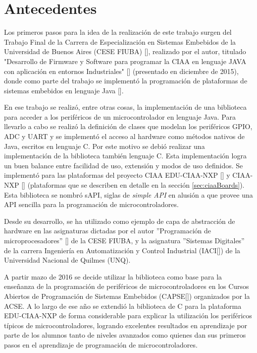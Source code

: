 \section{Antecedentes}
\label{sec:antecedentes}

Los primeros pasos para la idea de la realización de este trabajo surgen del Trabajo Final de la Carrera de Especialización en Sistemas Embebidos de la Universidad de Buenos Aires (CESE FIUBA) [], realizado por el autor, titulado "Desarrollo de Firmware y Software para programar la CIAA en lenguaje JAVA con aplicación en entornos Industriales" [] (presentado en diciembre de 2015), donde como parte del trabajo se implementó la programación de plataformas de sistemas embebidos en lenguaje Java []. 

En ese trabajo se realizó, entre otras cosas, la implementación de una biblioteca para acceder a los periféricos de un microcontrolador en lenguaje Java. Para llevarlo a cabo se realizó la definición de clases que modelan los periféricos GPIO, ADC y UART y se implementó el acceso al hardware como métodos nativos de Java, escritos en lenguaje C. Por este motivo se debió realizar una implementación de la biblioteca también lenguaje C. Esta implementación logra un buen balance entre facilidad de uso, extensión y modos de uso definidos. Se implementó para las plataformas del proyecto CIAA EDU-CIAA-NXP [] y CIAA-NXP [] (plataformas que se describen en detalle en la sección \ref{sec:ciaaBoards}). Esta biblioteca se nombró sAPI, siglas de \emph{simple API} en alusión a que provee una API sencilla para la programación de microcontroladores.

Desde su desarrollo, se ha utilizado como ejemplo de capa de abstracción de hardware en las asignaturas dictadas por el autor ''Programación de microprocesadores'' [] de la CESE FIUBA, y la asignatura ''Sistemas Digitales'' de la carrera Ingeniería en Automatización y Control Industrial (IACI[]) de la Universidad Nacional de Quilmes (UNQ).

A partir mazo de 2016 se decide utilizar la biblioteca como base para la enseñanza de la programación de periféricos de microcontroladores en los Cursos Abiertos de Programación de Sistemas Embebidos (CAPSE[]) organizados por la ACSE. A lo largo de ese año se extendió la biblioteca de C para la plataforma EDU-CIAA-NXP de forma considerable para explicar la utilización los periféricos típicos de microcontroladores, logrando excelentes resultados en aprendizaje por parte de los alumnos tanto de niveles avanzados como quienes dan sus primeros pasos en el aprendizaje de programación de microcontroladores.


